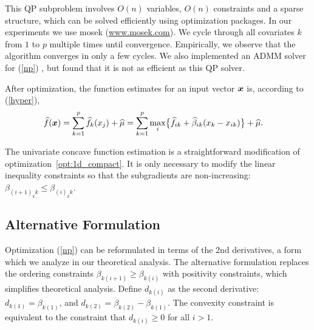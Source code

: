 This QP
subproblem involves $O(n)$ variables, $O(n)$ constraints and a sparse
structure, which can be solved efficiently using optimization
packages. In our experiments we use {\sc mosek} (\href{http://www.mosek.com/}{www.mosek.com}).  We cycle through
all covariates $k$ from $1$ to $p$ multiple times until convergence.
Empirically, we observe that the algorithm converges in only a few
cycles. We also implemented an ADMM solver for (\ref{np})
\citep{Boyd:admm}, but found
that it is not as efficient as this QP solver.

After optimization, the function estimates for an input vector $\boldsymbol{x}$ is, according to (\ref{hyper}),
\begin{equation}
\begin{split}
      \widehat f(\boldsymbol{x}) & = \sum_{k=1}^{p} \widehat f_k(x_{j})+ \widehat \mu 
= \sum_{k=1}^{p}\max_{i} \bigl\{\widehat f_{ik}+ \widehat \beta_{ik}(x_{k}-x_{ik})\bigr\} +
      \widehat \mu.
\end{split}
\end{equation} 

The univariate concave function estimation is a straightforward
modification of optimization~\ref{opt:1d_compact}. It is only
necessary to modify the linear inequality constraints so that the subgradients are
non-increasing: $\beta_{(i+1)_kk} \leq \beta_{(i)_kk}$.


\subsection{Alternative Formulation}
Optimization (\ref{np}) can be reformulated in terms of the 2nd derivatives, a form which we analyze in our theoretical analysis. The alternative formulation replaces the ordering
constraints $\beta_{k(i+1)} \geq \beta_{k(i)}$ with positivity
constraints, which simplifies theoretical analysis.
Define $d_{k(i)}$ as the second derivative:
$d_{k(1)} = \beta_{k(1)}$, and $d_{k(2)} =
\beta_{k(2)} - \beta_{k(1)}$. The convexity constraint is
equivalent to the constraint that $d_{k(i)} \geq 0$ for all $i >
1$.

